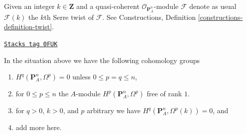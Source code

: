Given an integer $k \in \mathbf{Z}$ and a quasi-coherent
$\mathcal{O}_{\mathbf{P}^n_A}$-module $\mathcal{F}$
denote as usual $\mathcal{F}(k)$ the $k$th Serre twist of $\mathcal{F}$.
See Constructions, Definition \ref{constructions-definition-twist}.

\begin{lemma}
\label{derham-lemma-twisted-hodge-cohomology-projective-space}
\href{https://stacks.math.columbia.edu/tag/0FUK}{\texttt{Stacks tag 0FUK}}

In the situation above we have the following cohomology groups
\begin{enumerate}
\item $H^q(\mathbf{P}^n_A, \Omega^p) = 0$
unless $0 \leq p = q \leq n$,
\item for $0 \leq p \leq n$ the $A$-module
$H^p(\mathbf{P}^n_A, \Omega^p)$ free of rank $1$.
\item for $q > 0$, $k > 0$, and $p$ arbitrary we have
$H^q(\mathbf{P}^n_A, \Omega^p(k)) = 0$, and
\item add more here.
\end{enumerate}
\end{lemma}

